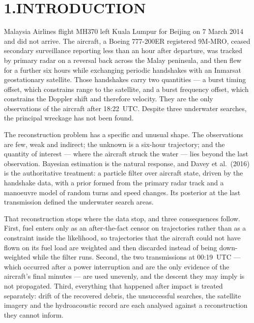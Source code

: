 \documentclass[12pt,a4paper]{article}
\begin{document}
\section*{1.\quad INTRODUCTION}

Malaysia Airlines flight MH370 left Kuala Lumpur for Beijing on 7 March 2014 and did not
arrive. The aircraft, a Boeing 777-200ER registered 9M-MRO, ceased secondary surveillance
reporting less than an hour after departure, was tracked by primary radar on a reversal back
across the Malay peninsula, and then flew for a further six hours while exchanging periodic
handshakes with an Inmarsat geostationary satellite. Those handshakes carry two
quantities --- a burst timing offset, which constrains range to the satellite, and a burst
frequency offset, which constrains the Doppler shift and therefore velocity. They are the only
observations of the aircraft after 18:22~UTC. Despite three underwater searches, the principal
wreckage has not been found.

The reconstruction problem has a specific and unusual shape. The observations are few, weak
and indirect; the unknown is a six-hour trajectory; and the quantity of interest --- where the
aircraft struck the water --- lies beyond the last observation. Bayesian estimation is the
natural response, and Davey et al.\ (2016) is the authoritative treatment: a particle filter
over aircraft state, driven by the handshake data, with a prior formed from the primary radar
track and a manoeuvre model of random turns and speed changes. Its posterior at the last
transmission defined the underwater search areas.

That reconstruction stops where the data stop, and three consequences follow. First, fuel
enters only as an after-the-fact censor on trajectories rather than as a constraint inside the
likelihood, so trajectories that the aircraft could not have flown on its fuel load are
weighted and then discarded instead of being down-weighted while the filter runs. Second, the
two transmissions at 00:19~UTC --- which occurred after a power interruption and are the only
evidence of the aircraft's final minutes --- are used unevenly, and the descent they may imply
is not propagated. Third, everything that happened after impact is treated separately:
drift of the recovered debris, the unsuccessful searches, the satellite imagery and the
hydroacoustic record are each analysed against a reconstruction they cannot inform.
\end{document}
